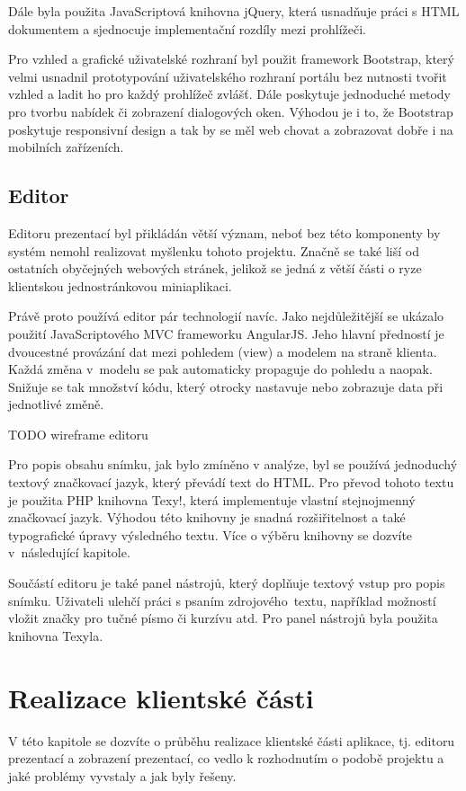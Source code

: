 \documentclass[11pt,twoside,a4paper]{book}
\begin{document}
Dále byla použita JavaScriptová knihovna jQuery\cite{jQuery}, která usnadňuje práci s HTML dokumentem a sjednocuje implementační rozdíly mezi prohlížeči.

Pro vzhled a grafické uživatelské rozhraní byl použit framework Bootstrap\cite{bootstrap}, který velmi usnadnil prototypování uživatelského rozhraní portálu bez nutnosti tvořit vzhled a ladit ho pro každý prohlížeč zvlášť. Dále poskytuje jednoduché metody pro tvorbu nabídek či zobrazení dialogových oken. Výhodou je i to, že Bootstrap poskytuje responsivní design a tak by se měl web chovat a zobrazovat dobře i na mobilních zařízeních.


\section{Editor}
Editoru prezentací byl přikládán větší význam, neboť bez této komponenty by systém nemohl realizovat myšlenku tohoto projektu. Značně se také liší od ostatních obyčejných webových stránek, jelikož se jedná z větší části o ryze klientskou jednostránkovou miniaplikaci.

Právě proto používá editor pár technologií navíc. Jako nejdůležitější se ukázalo použití JavaScriptového MVC frameworku AngularJS\cite{angular}. Jeho hlavní předností je dvoucestné provázání dat mezi pohledem (view) a modelem na straně klienta. Každá změna v~modelu se pak automaticky propaguje do pohledu a naopak. Snižuje se tak množství kódu, který otrocky nastavuje nebo zobrazuje data při jednotlivé změně. 

TODO wireframe editoru

Pro popis obsahu snímku, jak bylo zmíněno v analýze, byl se používá jednoduchý textový značkovací jazyk, který převádí text do HTML. Pro převod tohoto textu je použita PHP knihovna Texy!\cite{texy}, která implementuje vlastní stejnojmenný značkovací jazyk. Výhodou této knihovny je snadná rozšiřitelnost a také typografické úpravy výsledného textu. Více o výběru knihovny se dozvíte v~následující kapitole.

Součástí editoru je také panel nástrojů, který doplňuje textový vstup pro popis snímku. Uživateli ulehčí práci s psaním zdrojového~textu, například možností vložit značky pro tučné písmo či kurzívu atd. Pro panel nástrojů byla použita knihovna Texyla\cite{texyla}.



\chapter{Realizace klientské části} \label{chap:realizace}
V této kapitole se dozvíte o průběhu realizace klientské části aplikace, tj. editoru prezentací a zobrazení prezentací, co vedlo k rozhodnutím o podobě projektu a jaké problémy vyvstaly a jak byly řešeny.
\end{document}
